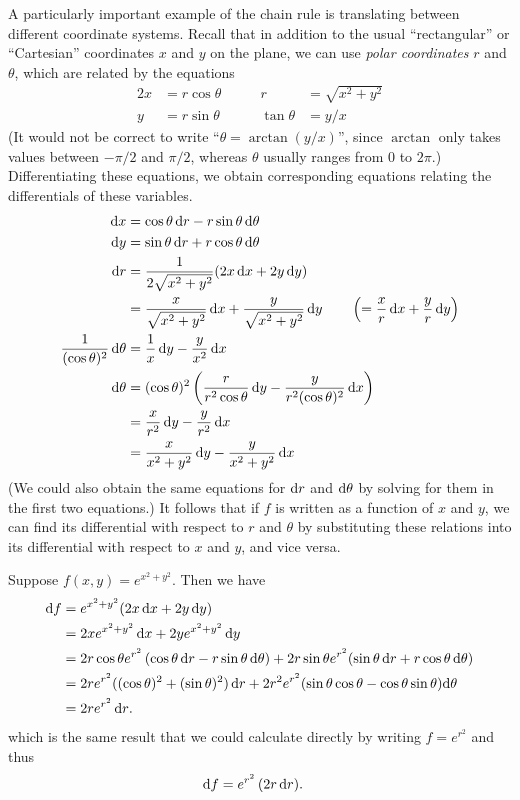 \documentclass[12pt]{amsart}
\begin{document}
A particularly important example of the chain rule is translating between different coordinate systems.
Recall that in addition to the usual ``rectangular'' or ``Cartesian'' coordinates $x$ and $y$ on the plane, we can use \emph{polar coordinates} $r$ and $\theta$, which are related by the equations
\begin{alignat*}{2}
  x &= r \cos \theta &\qquad r &= \sqrt{x^2+y^2}\\
  y &= r \sin\theta &\qquad \tan \theta &= y/x
\end{alignat*}
(It would not be correct to write ``$\theta = \arctan(y/x)$'', since $\arctan$ only takes values between $-\pi/2$ and $\pi/2$, whereas $\theta$ usually ranges from $0$ to $2\pi$.)
Differentiating these equations, we obtain corresponding equations relating the differentials of these variables.
\begin{align}
  {\ensuremath{\mathrm{d} x}} &= \cos \theta \,{\mathrm{d} r} - r \sin\theta \,{\mathrm{d} \theta} \label{eq:polar-dx} \\
  {\mathrm{d} y} &= \sin\theta \,{\mathrm{d} r} + r \cos\theta\,{\mathrm{d} \theta} \label{eq:polar-dy}\\
  {\mathrm{d} r} &= \frac{1}{2\sqrt{x^2+y^2}}(2x\,{\mathrm{d} x} + 2y\,{\mathrm{d} y}) \notag\\
  &= \frac{x}{\sqrt{x^2+y^2}}\,{\mathrm{d} x} + \frac{y}{\sqrt{x^2+y^2}}\,{\mathrm{d} y}
  \qquad\left(= \frac{x}{r} \,{\mathrm{d} x} + \frac{y}{r}\,{\mathrm{d} y}\right) \notag\\
  \frac{1}{(\cos \theta)^2} \,{\mathrm{d} \theta} &= \frac{1}{x}\,{\mathrm{d} y} - \frac{y}{x^2}\,{\mathrm{d} x} \notag\\
  {\mathrm{d} \theta} &= (\cos \theta)^2 \left( \frac{r}{r^2\cos\theta}\,{\mathrm{d} y} - \frac{y}{r^2 (\cos\theta)^2}\,{\mathrm{d} x}\right) \notag\\
  &= \frac{x}{r^2} \,{\mathrm{d} y} - \frac{y}{r^2} \,{\mathrm{d} x} \notag\\
  &= \frac{x}{x^2+y^2} \,{\mathrm{d} y} - \frac{y}{x^2+y^2} \,{\mathrm{d} x} \notag
\end{align}
(We could also obtain the same equations for ${\mathrm{d} r}$ and ${\mathrm{d} \theta}$ by solving for them in the first two equations.)
It follows that if $f$ is written as a function of $x$ and $y$, we can find its differential with respect to $r$ and $\theta$ by substituting these relations into its differential with respect to $x$ and $y$, and vice versa.

\begin{eg}
  Suppose $f(x,y) = e^{x^2+y^2}$.
  Then we have
  \begin{align*}
    {\ensuremath{\mathrm{d} f}} &= e^{x^2+y^2} (2x \,{\mathrm{d} x} + 2y\,{\mathrm{d} y})\\
    &= 2x e^{x^2+y^2} \,{\mathrm{d} x} + 2y e^{x^2+y^2} \,{\mathrm{d} y}\\
    &= 2 r\cos\theta e^{r^2} \, (\cos \theta \,{\mathrm{d} r} - r \sin\theta \,{\mathrm{d} \theta}) + 2r\sin\theta e^{r^2} (\sin\theta \,{\mathrm{d} r} + r \cos\theta\,{\mathrm{d} \theta})\\
    &= 2r e^{r^2} ((\cos\theta)^2 + (\sin\theta)^2)\,{\mathrm{d} r} + 2r^2 e^{r^2}(\sin\theta\cos\theta - \cos\theta\sin\theta) {\mathrm{d} \theta}\\
    &= 2r e^{r^2}\,{\mathrm{d} r}.
  \end{align*}
  which is the same result that we could calculate directly by writing $f = e^{r^2}$ and thus
  \begin{align*}
    {\ensuremath{\mathrm{d} f}} &= e^{r^2} \, (2r\,{\mathrm{d} r}).
  \end{align*}
\end{eg}
\end{document}
